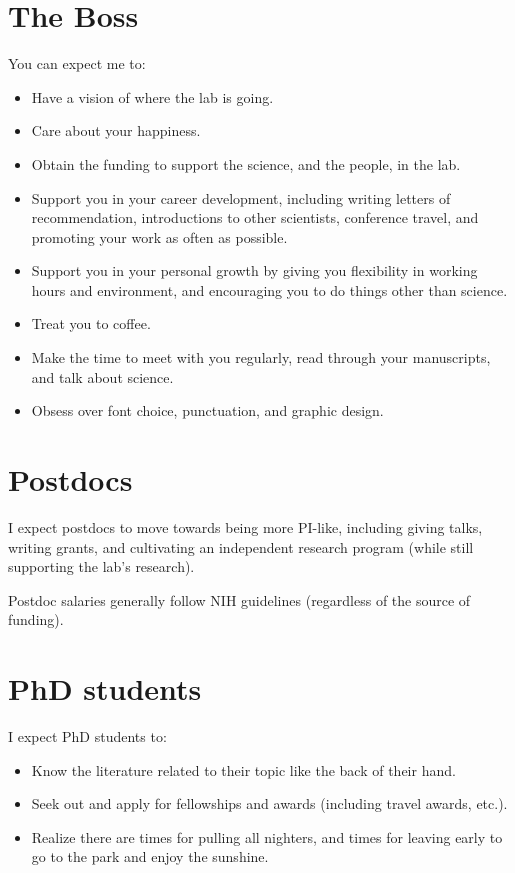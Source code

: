 \documentclass[letterpaper,12pt,oneside]{memoir}
\begin{document}
\section{The Boss}

You can expect me to:

\begin{itemize}
\item Have a vision of where the lab is going.
\item Care about your happiness.
\item Obtain the funding to support the science, and the people, in the lab.
\item Support you in your career development, including writing letters of recommendation, introductions to other scientists, conference travel, and promoting your work as often as possible.
\item Support you in your personal growth by giving you flexibility in working hours and environment, and encouraging you to do things other than science.
\item Treat you to coffee.
\item Make the time to meet with you regularly, read through your manuscripts, and talk about science.
\item Obsess over font choice, punctuation, and graphic design.
\end{itemize}

\section{Postdocs}

I expect postdocs to move towards being more PI-like, including  giving talks, writing grants, and cultivating an independent research program (while still supporting the lab's research). 


Postdoc salaries generally follow NIH guidelines (regardless of the source of funding).

\section{PhD students}

I expect PhD students to:

\begin{itemize}
\item Know the literature related to their topic like the back of their hand.
\item Seek out and apply for fellowships and awards (including travel awards, etc.).
\item Realize there are times for pulling all nighters, and times for leaving early to go to the park and enjoy the sunshine.
\end{itemize}
\end{document}
